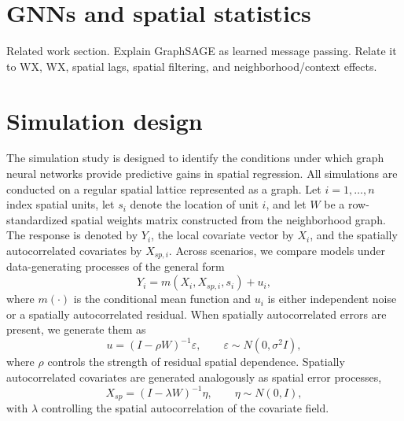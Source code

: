 \documentclass[ASNA, twocolumn]{USG} %
\begin{document}
\section{GNNs and spatial statistics}
\label{sec:related}

Related work section. Explain GraphSAGE as learned message passing. Relate it to WX, WX, spatial lags, spatial filtering, and neighborhood/context effects.

\section{Simulation design}
\label{sec:design}


The simulation study is designed to identify the conditions under which graph neural networks provide predictive gains in spatial regression. All simulations are conducted on a regular spatial lattice represented as a graph. Let \(i=1,\ldots,n\) index spatial units, let \(s_i\) denote the location of unit \(i\), and let \(W\) be a row-standardized spatial weights matrix constructed from the neighborhood graph. The response is denoted by \(Y_i\), the local covariate vector by \(X_i\), and the spatially autocorrelated covariates by \(X_{sp,i}\). Across scenarios, we compare models under data-generating processes of the general form
\[
Y_i = m(X_i,X_{sp,i},s_i) + u_i,
\]
where \(m(\cdot)\) is the conditional mean function and \(u_i\) is either independent noise or a spatially autocorrelated residual. When spatially autocorrelated errors are present, we generate them as
\[
u = (I-\rho W)^{-1}\varepsilon,
\qquad
\varepsilon \sim N(0,\sigma^2 I),
\]
where \(\rho\) controls the strength of residual spatial dependence. Spatially autocorrelated covariates are generated analogously as spatial error processes,
\[
X_{sp} = (I-\lambda W)^{-1}\eta,
\qquad
\eta \sim N(0,I),
\]
with \(\lambda\) controlling the spatial autocorrelation of the covariate field.
\end{document}
